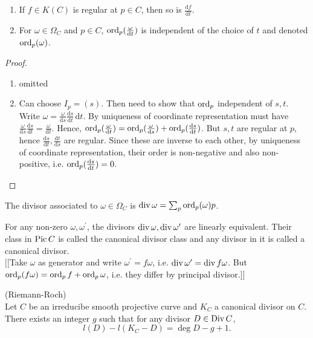 \documentclass[a4paper,11pt]{article}
\begin{document}
			\begin{prop}
				\begin{enumerate}
					\item If $f\in K(C)$ is regular at $p\in C$, then so is $\frac{\mathrm{d}f}{\mathrm{d}t}$.
					\item For $\omega\in \Omega_C$ and $p\in C$, $\operatorname{ord}_p(\frac{\omega}{\mathrm{d}t})$ is independent of the choice of $t$ and denoted $\operatorname{ord}_p(\omega)$.
				\end{enumerate}
			\end{prop}
			\begin{proof}
				\begin{enumerate}
					\item omitted
					\item Can choose $I_p=(s)$. Then need to show that $\operatorname{ord}_p$ independent of $s,t$. Write $\omega=\frac{\omega}{\mathrm{d}s}\frac{\mathrm{d}s}{\mathrm{d}t}\,\mathrm{d}t$. By uniqueness of coordinate representation must have $\frac{\omega}{\mathrm{d}s}\frac{\mathrm{d}s}{\mathrm{d}t}=\frac{\omega}{\mathrm{d}t}$. Hence, $\operatorname{ord}_p(\frac{\omega}{\mathrm{d}t})=\operatorname{ord}_p(\frac{\omega}{\mathrm{d}s})+\operatorname{ord}_p(\frac{\mathrm{d}s}{\mathrm{d}t})$. But $s,t$ are regular at $p$, hence $\frac{\mathrm{d}s}{\mathrm{d}t},\frac{\mathrm{d}t}{\mathrm{d}s}$ are regular. Since these are inverse to each other, by uniqueness of coordinate representation, their order is non-negative and also non-positive, i.e. $\operatorname{ord}_p(\frac{\mathrm{d}s}{\mathrm{d}t})=0$.
				\end{enumerate}
			\end{proof}

			\begin{defi}
				The divisor associated to $\omega\in\Omega_C$ is $\operatorname{div}\omega=\sum_p\operatorname{ord}_p(\omega)p$.
			\end{defi}

			\begin{remark}
				For any non-zero $\omega,\omega^\prime$, the divisors $\operatorname{div}\omega,\operatorname{div}\omega^\prime$ are linearly equivalent. Their class in $\operatorname{Pic} C$ is called the canonical divisor class and any divisor in it is called a canonical divisor.\\
				$[[$Take $\omega$ as generator and write $\omega^\prime=f \omega$, i.e. $\operatorname{div}\omega^\prime=\operatorname{div} f\omega$. But $\operatorname{ord}_p(f\omega)=\operatorname{ord}_p f+\operatorname{ord}_p\omega$, i.e. they differ by principal divisor.$]]$
			\end{remark}

			\begin{thm}\label{thm--RiemannRoch}
				(Riemann-Roch)\\Let $C$ be an irreducibe smooth projective curve and $K_C$ a canonical divisor on $C$. There exists an integer $g$ such that for any divisor $D\in\operatorname{Div} C$,
				\begin{equation*}
					l(D)-l(K_C-D)=\deg D-g+1.
				\end{equation*}
			\end{thm}
\end{document}
